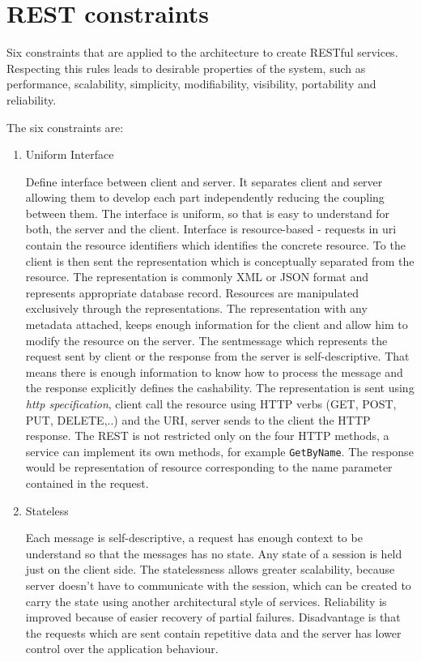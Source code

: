 \section{REST constraints}
\label{sec:constraints}

Six constraints that are applied to the architecture to create RESTful services. Respecting this rules leads to desirable properties of the system, such as performance, scalability, simplicity, modifiability, visibility, portability and reliability. 
\begin{description}
  \item The six constraints are:
  

\begin{enumerate}
  \item Uniform Interface
  
Define interface between client and server. It separates client and server allowing them to develop each part independently reducing the coupling between them. The interface is uniform, so that is easy to understand for both, the server and the client.
Interface is resource-based - requests in \gls{uri} contain the resource identifiers which identifies the concrete resource. To the client is then sent the representation which is conceptually separated from the resource. The representation is commonly XML or JSON format and represents appropriate database record.
Resources are manipulated exclusively through the representations. The representation with any metadata attached, keeps enough information for the client and allow him to modify the resource on the server.
The sentmessage which represents the request sent by client or the response from the server is self-descriptive. That means there is enough information to know how to process the message and the response explicitly defines the cashability.
The representation is sent using \emph{\gls{http} specification}, client call the resource using HTTP verbs (GET, POST, PUT, DELETE,..) and the URI, server sends to the client the HTTP response.
The REST is not restricted only on the four HTTP methods, a service can implement its own methods, for example \texttt{GetByName}. The response would be representation of resource corresponding to the name parameter contained in the request. 

  \item Stateless
  
Each message is self-descriptive, a request has enough context to be understand so that the messages has no state. Any state of a \gls{session} is held just on the client side.
The statelessness allows greater scalability, because server doesn't have to communicate with the session, which can be created to carry the state using another architectural style of services. Reliability is improved because of easier recovery of partial failures. Disadvantage is that the requests which are sent contain repetitive data and the server has lower control over the application behaviour.


\end{enumerate}
\end{description}
